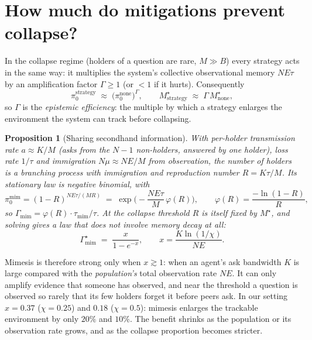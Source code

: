 \documentclass[10pt]{article}
\newtheorem{proposition}{Proposition}
\begin{document}
\section{How much do mitigations prevent collapse?}
\label{sec:prevention}
In the collapse regime (holders of a question are rare, $M \gg B$) every strategy acts in the same way: it multiplies the system's collective observational memory $N E \tau$ by an amplification factor $\Gamma \ge 1$ (or $<1$ if it hurts). Consequently
\begin{equation}
\pi_0^{\text{strategy}} \;\approx\; \big(\pi_0^{\text{none}}\big)^{\Gamma},
\qquad
M^\star_{\text{strategy}} \;\approx\; \Gamma\, M^\star_{\text{none}} ,
\label{eq:gamma}
\end{equation}
so $\Gamma$ is the \emph{epistemic efficiency}: the multiple by which a strategy enlarges the environment the system can track before collapsing.

\begin{proposition}[Sharing secondhand information]
With per-holder transmission rate $a \approx K/M$ (asks from the $N-1$ non-holders, answered by one holder), loss rate $1/\tau$ and immigration $N\mu \approx NE/M$ from observation, the number of holders is a branching process with immigration and reproduction number $R = K\tau/M$. Its stationary law is negative binomial, with
\begin{equation}
\pi_0^{\text{mim}} = (1-R)^{N E \tau/(M R)}
\;=\; \exp\!\Big(-\frac{N E \tau}{M}\,\varphi(R)\Big),\qquad \varphi(R) = \frac{-\ln(1-R)}{R},
\end{equation}
so $\Gamma_{\text{mim}} = \varphi(R) \cdot \tau_{\text{mim}}/\tau$. At the collapse threshold $R$ is itself fixed by $M^\star$, and solving gives a law that does not involve memory decay at all:
\begin{equation}
\Gamma^\star_{\text{mim}} \;=\; \frac{x}{1 - e^{-x}}, \qquad x = \frac{K \ln(1/\chi)}{N E}.
\end{equation}
\end{proposition}
\noindent Mimesis is therefore strong only when $x \gtrsim 1$: when an agent's ask bandwidth $K$ is large compared with the \emph{population's} total observation rate $NE$. It can only amplify evidence that someone has observed, and near the threshold a question is observed so rarely that its few holders forget it before peers ask. In our setting $x = 0.37$ ($\chi = 0.25$) and $0.18$ ($\chi = 0.5$): mimesis enlarges the trackable environment by only $20\%$ and $10\%$. The benefit shrinks as the population or its observation rate grows, and as the collapse proportion becomes stricter.
\end{document}
